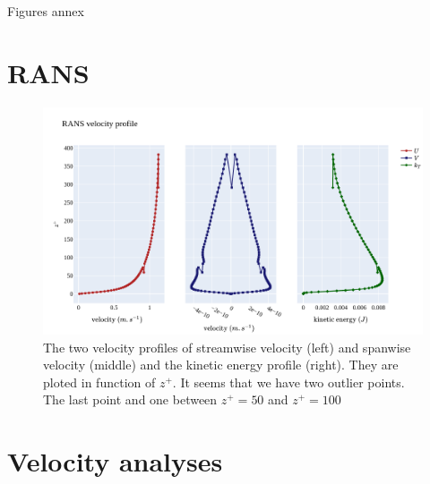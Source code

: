 \documentclass[]{article}
\theoremstyle{plain}
\theoremstyle{remark}
\begin{document}
\begin{center} 
	\huge Figures annex
\end{center}

\section*{RANS}

\begin{figure}[h]
	\begin{center}
	\includegraphics[width=\textwidth]{../output/RANS/profiles.png}
	\caption{The two velocity profiles of streamwise velocity (left) and spanwise velocity (middle) and the kinetic energy profile (right). They are ploted in function of $z^+$. It seems that we have two outlier points. The last point and one between $z^+=50$ and $z^+=100$}
	\end{center}
\end{figure}



\section*{Velocity analyses}
\newpage
\end{document}
